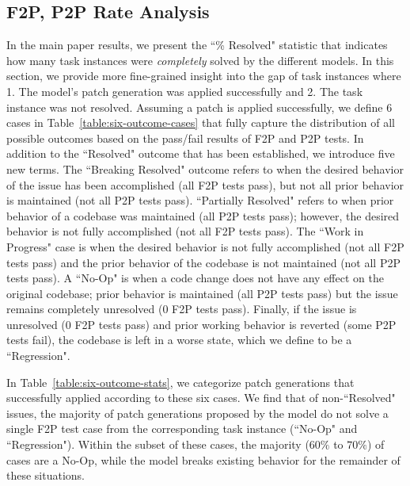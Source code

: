 

\subsection{F2P, P2P Rate Analysis}

In the main paper results, we present the ``\% Resolved" statistic that indicates how many task instances were \textit{completely} solved by the different models.
In this section, we provide more fine-grained insight into the gap of task instances where 1. The model's patch generation was applied successfully and 2. The task instance was not resolved.
Assuming a patch is applied successfully, we define $6$ cases in Table~\ref{table:six-outcome-cases} that fully capture the distribution of all possible outcomes based on the pass/fail results of F2P and P2P tests.
In addition to the ``Resolved" outcome that has been established, we introduce five new terms.
The ``Breaking Resolved" outcome refers to when the desired behavior of the issue has been accomplished (all F2P tests pass), but not all prior behavior is maintained (not all P2P tests pass).
``Partially Resolved" refers to when prior behavior of a codebase was maintained (all P2P tests pass); however, the desired behavior is not fully accomplished (not all F2P tests pass).
The ``Work in Progress" case is when the desired behavior is not fully accomplished (not all F2P tests pass) and the prior behavior of the codebase is not maintained (not all P2P tests pass).
A ``No-Op" is when a code change does not have any effect on the original codebase; prior behavior is maintained (all P2P tests pass) but the issue remains completely unresolved ($0$ F2P tests pass).
Finally, if the issue is unresolved ($0$ F2P tests pass) and prior working behavior is reverted (some P2P tests fail), the codebase is left in a worse state, which we define to be a ``Regression".



In Table~\ref{table:six-outcome-stats}, we categorize patch generations that successfully applied according to these six cases.
We find that of non-``Resolved" issues, the majority of patch generations proposed by the model do not solve a single F2P test case from the corresponding task instance (``No-Op" and ``Regression").
Within the subset of these cases, the majority ($60\%$ to $70\%$) of cases are a No-Op, while the model breaks existing behavior for the remainder of these situations.

